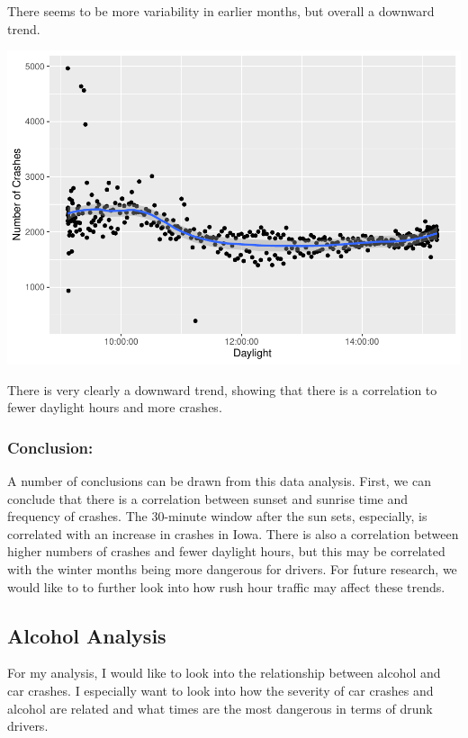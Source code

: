 \documentclass[conference,final,]{IEEEtran}
\begin{document}
There seems to be more variability in earlier months, but overall a downward trend.

\begin{center}\includegraphics[width=0.9\columnwidth]{CAUSE_files/figure-latex/unnamed-chunk-5-1} \end{center}

There is very clearly a downward trend, showing that there is a correlation to fewer daylight hours and more crashes.

\hypertarget{conclusion}{%
\subsubsection{Conclusion:}\label{conclusion}}

A number of conclusions can be drawn from this data analysis. First, we can conclude that there is a correlation between sunset and sunrise time and frequency of crashes. The 30-minute window after the sun sets, especially, is correlated with an increase in crashes in Iowa. There is also a correlation between higher numbers of crashes and fewer daylight hours, but this may be correlated with the winter months being more dangerous for drivers. For future research, we would like to to further look into how rush hour traffic may affect these trends.

\hypertarget{alcohol-analysis}{%
\subsection{Alcohol Analysis}\label{alcohol-analysis}}

For my analysis, I would like to look into the relationship between alcohol and car crashes. I especially want to look into how the severity of car crashes and alcohol are related and what times are the most dangerous in terms of drunk drivers.
\end{document}
